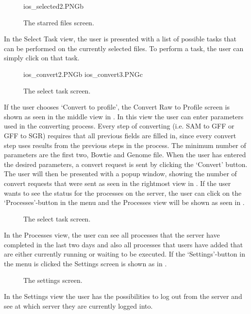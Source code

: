\begin{figure}[htb]
		{ios_selected2.PNG}{b}
\caption{The starred files screen.}
\label{fig:ios_selectedFiles}
\end{figure}
\FloatBarrier
In the Select Task view, the user is presented with a list of possible tasks that can be performed on the currently selected files. To perform a task, the user can simply click on that task.

\begin{figure}[htb]
		{ios_convert2.PNG}{b}
		{ios_convert3.PNG}{c}
\caption{The select task screen.}
\label{fig:ios_convert}
\end{figure}
\FloatBarrier
If the user chooses ‘Convert to profile’, the Convert Raw to Profile screen is shown as seen in the middle view in . In this view the user can enter parameters used in the converting process. Every step of converting (i.e. SAM to GFF or GFF to SGR) requires that all previous fields are filled in, since every convert step uses results from the previous steps in the process. The minimum number of parameters are the first two, Bowtie and Genome file. When the user has entered the desired parameters, a convert request is sent by clicking the ‘Convert’ button. The user will then be presented with a popup window, showing the number of convert requests that were sent as seen in the rightmost view in . If the user wants to see the status for the processes on the server, the user can click on the ‘Processes’-button in the menu and the Processes view will be shown as seen in .
\begin{figure}[htb]
\caption{The select task screen.}
\label{fig:ios_processes}
\end{figure}
\FloatBarrier
In the Processes view, the user can see all processes that the server have completed in the last two days and also all processes that users have added that are either currently running or waiting to be executed.
If the ‘Settings’-button in the menu is clicked the Settings screen is shown as in .  

\begin{figure}[htb]
\caption{The settings screen.}
\label{fig:ios_more}
\end{figure}
\FloatBarrier
In the Settings view the user has the possibilities to log out from the server and see at which server they are currently logged into. 









